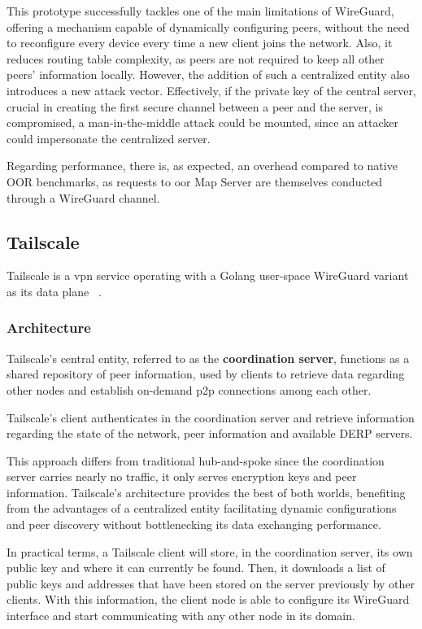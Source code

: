 \documentclass[11pt,twoside,a4paper]{report}
\begin{document}
This prototype successfully tackles one of the main limitations of WireGuard, offering a mechanism capable of dynamically configuring peers, without the need to reconfigure every device every time a new client joins the network. Also, it reduces routing table complexity, as peers are not required to keep all other peers' information locally. However, the addition of such a centralized entity also introduces a new attack vector. Effectively, if the private key of the central server, crucial in creating the first secure channel between a peer and the server, is compromised, a man-in-the-middle attack could be mounted, since an attacker could impersonate the centralized server.

Regarding performance, there is, as expected, an overhead compared to native OOR benchmarks, as requests to \ac{oor} Map Server are themselves conducted through a WireGuard channel.
\fi

\subsection{Tailscale}

Tailscale is a \ac{vpn} service operating with a Golang user-space WireGuard variant as its data plane ~\cite{tailscale2020online}.

\subsubsection{Architecture}

Tailscale's central entity, referred to as the \textbf{coordination server}, functions as a shared repository of peer information, used by clients to retrieve data regarding other nodes and establish on-demand \ac{p2p} connections among each other.

Tailscale's client authenticates in the coordination server and retrieve information regarding the state of the network, peer information and available \ac{DERP} servers.

This approach differs from traditional hub-and-spoke since the coordination server carries nearly no traffic, it only serves encryption keys and peer information. Tailscale's architecture provides the best of both worlds, benefiting from the advantages of a centralized entity facilitating dynamic configurations and peer discovery without bottlenecking its data exchanging performance.

In practical terms, a Tailscale client will store, in the coordination server, its own public key and where it can currently be found. Then, it downloads a list of public keys and addresses that have been stored on the server previously by other clients. With this information, the client node is able to configure its WireGuard interface and start communicating with any other node in its domain.
\end{document}

